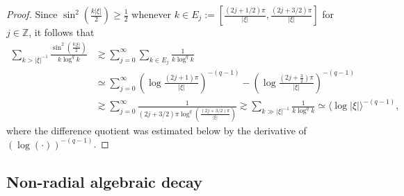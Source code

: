\documentclass{article}
\numberwithin{equation}{section}
\begin{document}
\begin{proof}
Since $\sin^2 \left(\frac{k|\xi|}{2}\right) \geq \frac{1}{2}$ whenever $k \in E_j := [\frac{(2j+1/2)\pi}{|\xi|},\frac{(2j+3/2)\pi}{|\xi|}]$ for $j \in \mathbb{Z}$, it follows that
\begin{equation*}
\begin{split}
\sum\limits_{k > |\xi|^{-1}} \frac{\sin^2 \left(\frac{k |\xi|}{2}\right)}{k \log^q k} &\gtrsim \sum_{j=0}^\infty \sum_{k \in E_j} \frac{1}{k \log^q k}\\
&\simeq \sum_{j=0}^\infty \left(\log \frac{(2j+1)\pi}{|\xi|}\right)^{-(q-1)} - \left(\log \frac{(2j+\frac{3}{2})\pi}{|\xi|}\right)^{-(q-1)}\\
&\gtrsim \sum_{j=0}^\infty \frac{1}{(2j+3/2)\pi \log^q \left(\frac{(2j+3/2)\pi}{|\xi|}\right)} \gtrsim \sum_{k \gg |\xi|^{-1}} \frac{1}{k \log^q k} \simeq \langle \log |\xi|\rangle^{-(q-1)},
\end{split}
\end{equation*}
where the difference quotient was estimated below by the derivative of $(\log (\cdot))^{-(q-1)}$. 
\end{proof}
\subsection{Non-radial algebraic decay}\label{non-radial}
\end{document}

